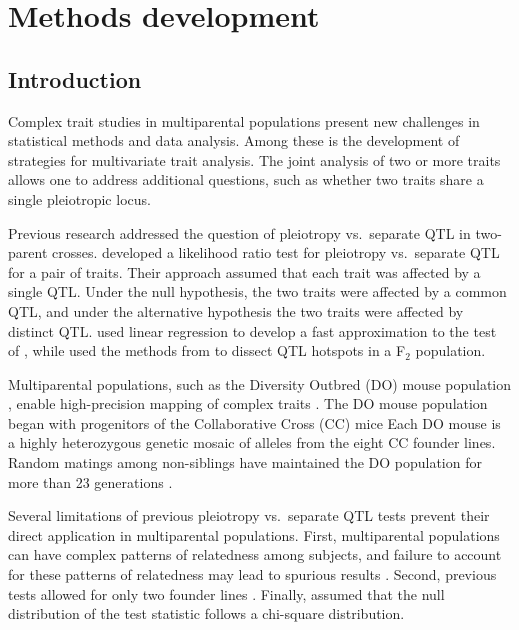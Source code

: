\documentclass[oneside]{book}\usepackage[]{graphicx}\usepackage[]{color}
\begin{document}
\chapter{Methods development}


\section{Introduction}

Complex trait studies in multiparental populations present new
challenges in statistical methods and data analysis. Among these is
the development of strategies for multivariate trait analysis. The
joint analysis of two or more traits allows one to address additional
questions, such as whether two traits share a single pleiotropic
locus.




Previous research addressed the question of pleiotropy vs.\ separate
QTL in two-parent crosses.
\citet{jiang1995multiple} developed a likelihood
ratio test for pleiotropy vs.\ separate QTL for a pair of traits.
Their approach assumed that each trait was affected by a single QTL.
Under the null hypothesis, the two traits were affected by a common
QTL, and under the alternative hypothesis the two traits were affected
by distinct QTL.
\citet{knott2000multitrait} used linear regression to develop a fast
approximation to the test of \citet{jiang1995multiple}, while
\citet{tian2016dissection} used the methods from
\citet{knott2000multitrait} to dissect QTL hotspots in a F$_2$
population.


Multiparental populations, such
as the Diversity Outbred (DO) mouse population \citep{churchill2012diversity}, enable high-precision
mapping of complex traits \citep{de2014genetics}. The DO
mouse population began with progenitors of the Collaborative
Cross (CC) mice \citep{churchill2004collaborative}
Each DO mouse is a highly heterozygous genetic mosaic
of alleles from the eight CC founder lines. Random
matings among non-siblings have maintained the DO
population for more than 23 generations \citep{chesler2016diversity}.

Several limitations of previous pleiotropy vs.\ separate QTL tests
prevent their direct application in multiparental populations. First,
multiparental populations can have complex patterns of relatedness
among subjects, and failure to account for these patterns of
relatedness may lead to spurious results \citep{yang2014advantages}.
Second, previous tests allowed for only two founder lines
\citep{jiang1995multiple}. Finally, \citet{jiang1995multiple} assumed
that the null distribution of the test statistic follows a chi-square
distribution.
\end{document}
